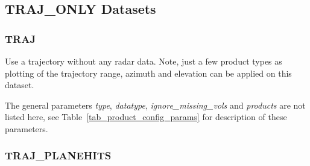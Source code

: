 \documentclass[a4paper,11pt,pdftex,twoside]{scrartcl}
\begin{document}
{{{%

\subsection{TRAJ\_ONLY Datasets}

\subsubsection{TRAJ}
\label{subsec_traj}

Use a trajectory without any radar data. Note, just a few product types as
plotting of the trajectory range, azimuth and elevation can be
applied on this dataset.

The general parameters \emph{type}, \emph{datatype}, \emph{ignore\_missing\_vols}
and \emph{products} are not listed here, see Table~\ref{tab_product_config_params} for
description of these parameters.

\subsubsection{TRAJ\_PLANEHITS}
\label{subsec_traj_planehits}

}}}
\end{document}
